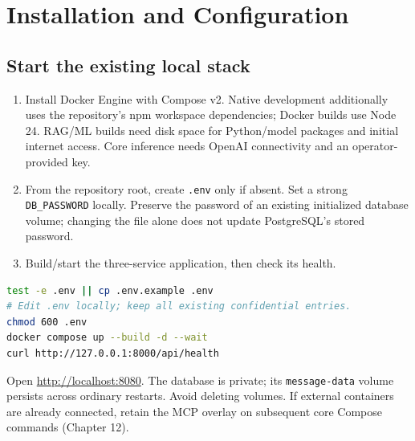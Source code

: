\chapter{Installation and Configuration}
\section{Start the existing local stack}
\begin{enumerate}
\item Install Docker Engine with Compose v2. Native development additionally uses the repository's npm workspace dependencies; Docker builds use Node 24. RAG/ML builds need disk space for Python/model packages and initial internet access. Core inference needs OpenAI connectivity and an operator-provided key.
\item From the repository root, create \texttt{.env} only if absent. Set a strong \texttt{DB\_PASSWORD} locally. Preserve the password of an existing initialized database volume; changing the file alone does not update PostgreSQL's stored password.
\item Build/start the three-service application, then check its health.
\end{enumerate}
\begin{lstlisting}[language=bash]
test -e .env || cp .env.example .env
# Edit .env locally; keep all existing confidential entries.
chmod 600 .env
docker compose up --build -d --wait
curl http://127.0.0.1:8000/api/health
\end{lstlisting}
Open \url{http://localhost:8080}. The database is private; its \texttt{message-data} volume persists across ordinary restarts. Avoid deleting volumes. If external containers are already connected, retain the MCP overlay on subsequent core Compose commands (Chapter 12).
